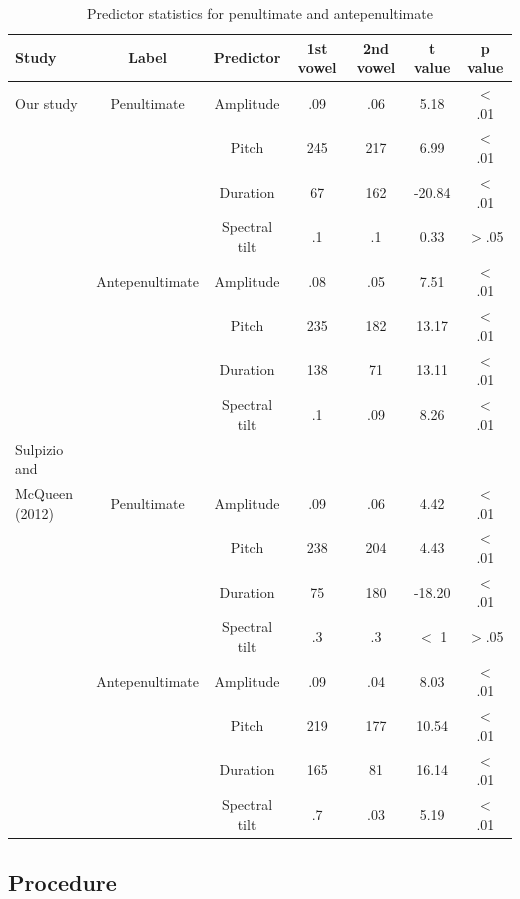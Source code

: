 \begin{table}[ht]
\centering
\caption{Predictor statistics for penultimate and antepenultimate}
\begin{tabular*}{\textwidth}{@{\extracolsep{\fill}} lcccccc}
\hline
\textbf{Study} & \textbf{Label} & \textbf{Predictor} & \textbf{1st vowel} & \textbf{2nd vowel} &\textbf{t value} & \textbf{p value}\\
\hline
Our study & Penultimate & Amplitude       & .09 & .06 & 5.18  & $<$ .01\\
     &           & Pitch           & 245 & 217 & 6.99  & $<$ .01\\
     &             & Duration        & 67 & 162 & -20.84 & $<$ .01\\
     &             & Spectral tilt   & .1 & .1 & 0.33  & $>$.05 \\
 & Antepenultimate & Amplitude       & .08 & .05 & 7.51  & $<$ .01\\
     &             & Pitch           & 235 & 182 & 13.17 & $<$ .01\\
     &             & Duration        & 138 & 71 & 13.11 & $<$ .01\\
     &             & Spectral tilt   & .1 & .09 & 8.26  & $<$ .01\\
\hline
Sulpizio and\\ McQueen (2012) &Penultimate & Amplitude     & .09 & .06   & 4.42 & $<$ .01\\
       &           & Pitch         & 238  & 204 & 4.43 & $<$ .01\\
       &           & Duration      & 75 & 180   & -18.20 & $<$ .01\\
       &           & Spectral tilt &.3 & .3 & $<$ 1  & $>$.05\\
& Antepenultimate  & Amplitude     & .09  & .04 & 8.03  & $<$ .01\\
       &           & Pitch         &  219 & 177 & 10.54  & $<$ .01\\
       &           & Duration      & 165  & 81  & 16.14  & $<$ .01\\
       &           & Spectral tilt &  .7  & .03  & 5.19  & $<$ .01\\
\hline
\end{tabular*}
\label{tab:acoustics}
\end{table}

\subsection{Procedure}

